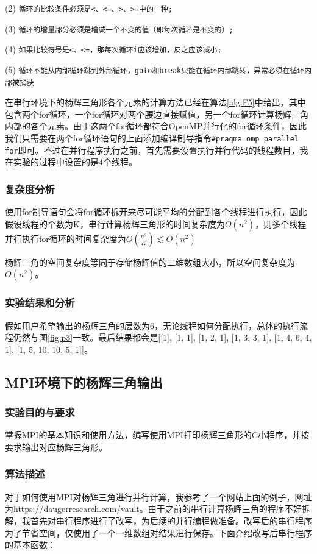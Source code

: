 \documentclass[supercite]{Experimental_Report}
\theoremstyle{definition}
\begin{document}
(2) \texttt{循环的比较条件必须是<、<=、>、>=中的一种;}

(3) \texttt{循环的增量部分必须是增减一个不变的值（即每次循环是不变的）;}

(4) \texttt{如果比较符号是<、<=，那每次循环i应该增加，反之应该减小;}

(5) \texttt{循环不能从内部循环跳到外部循环，goto和break只能在循环内部跳转，异常必须在循环内部被捕获}

在串行环境下的杨辉三角形各个元素的计算方法已经在算法\ref{alg:F5}中给出，其中包含两个for循环，一个for循环对两个腰边直接赋值，另一个for循环计算杨辉三角内部的各个元素。由于这两个for循环都符合OpenMP并行化的for循环条件，因此我们只需要在两个for循环语句的上面添加编译制导指令\texttt{\#pragma omp parallel for}即可。不过在并行程序执行之前，首先需要设置执行并行代码的线程数目，我在实验的过程中设置的是4个线程。

\subsubsection{复杂度分析}
使用for制导语句会将for循环拆开来尽可能平均的分配到各个线程进行执行，因此假设线程的个数为K，串行计算杨辉三角形的时间复杂度为$O(n^2)$，则多个线程并行执行for循环的时间复杂度为$O(\frac{n^2}{K})\lesssim O(n^2)$

杨辉三角的空间复杂度等同于存储杨辉值的二维数组大小，所以空间复杂度为$O(n^2)$。
\subsubsection{实验结果和分析}
假如用户希望输出的杨辉三角的层数为6，无论线程如何分配执行，总体的执行流程仍然与图\ref{fig:p3}一致。最后结果都会是[[1], [1, 1], [1, 2, 1], [1, 3, 3, 1], [1, 4, 6, 4, 1], [1, 5, 10, 10, 5, 1]]。

\subsection{MPI环境下的杨辉三角输出}
\subsubsection{实验目的与要求}
掌握MPI的基本知识和使用方法，编写使用MPI打印杨辉三角形的C小程序，并按要求输出对应杨辉三角形。
\subsubsection{算法描述}
对于如何使用MPI对杨辉三角进行并行计算，我参考了一个网站上面的例子，网址为\href{}{https://daugerresearch.com/vault}。由于之前的串行计算杨辉三角的程序不好拆解，我首先对串行程序进行了改写，为后续的并行编程做准备。改写后的串行程序为了节省空间，仅使用了一个一维数组对结果进行保存。下面介绍改写后串行程序的基本函数：
\end{document}
